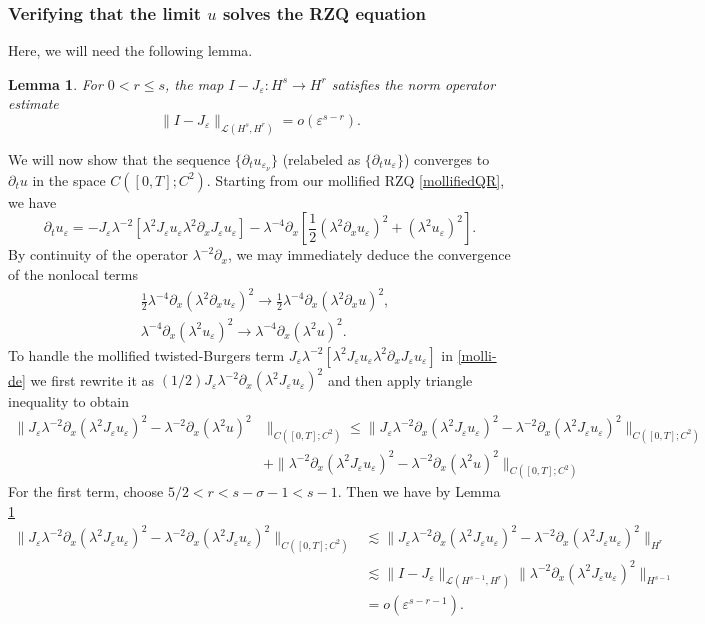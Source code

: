 \documentclass[reqno]{amsart}
\theoremstyle{plain}
\newtheorem{lemma}{Lemma}[section]
\numberwithin{equation}{section}
\newcommand{\p}{\partial}
\newcommand{\ee}{\varepsilon}
\newcommand{\s}{\sigma}
\begin{document}
\subsubsection{Verifying that the limit $u$ solves the RZQ equation}  Here, we will need the following lemma.
\begin{lemma}
\label{linop}
For $0<r\leq s$, the map $I-J_\ee:H^s \rightarrow H^r$ satisfies the norm operator estimate 
\begin{equation*}
\|I-J_\ee\|_{\mathcal{L}(H^s,H^r)}=o(\ee^{s-r}).
\end{equation*}
\end{lemma}
We will now show that the sequence $\{\p_tu_{\ee_\nu}\}$ (relabeled as $\{\p_tu_\ee\}$) converges to $\p_tu$ in the space $C([0,T];C^2)$.  Starting from our mollified RZQ \eqref{mollifiedQR}, we have
\begin{equation}\label{molli-de}
    \p_tu_\ee = -J_\ee \lambda^{-2} [ \lambda^2 J_\ee u_\ee \lambda^2 \partial_x J_\ee u_\ee ] 
  - \lambda^{-4} \p_x \left[ \frac12(\lambda^2 \p_xu_\ee)^2  +  
 (\lambda ^2  u_\ee)^2   \right].
\end{equation}
By continuity of the operator $\lambda^{-2}\p_x$, we may immediately deduce the convergence of the nonlocal terms
\begin{align*}
    &\frac12\lambda^{-4}\p_x(\lambda ^2\p_xu_\ee)^2 \to \frac12\lambda^{-4}\p_x(\lambda^2 \p_xu)^2, \\
    &\lambda^{-4}\p_x(\lambda^2 u_\ee)^2 \to \lambda^{-4}\p_x(\lambda^2 u)^2.
\end{align*}
To handle the mollified twisted-Burgers term $J_\ee \lambda^{-2} [ \lambda^2 J_\ee u_\ee \lambda^2 \partial_x J_\ee u_\ee ]$ in \eqref{molli-de} we first rewrite it as $(1/2)J_\ee\lambda^{-2}\p_x(\lambda^2 J_\ee u_\ee)^2$ and then apply triangle inequality to obtain
\begin{align}\label{ineq1}
\|J_\ee\lambda^{-2}\p_x(\lambda^2 J_\ee u_\ee)^2-\lambda^{-2}\p_x(\lambda^2 u)^2 & \|_{C([0,T];C^2)}  \leq \|J_\ee\lambda^{-2}\p_x(\lambda ^2J_\ee u_\ee)^2-\lambda^{-2}\p_x(\lambda^2  J_\ee u_\ee)^2\|_{C([0,T];C^2)} \nonumber \\
&+\|\lambda^{-2}\p_x(\lambda^2 J_\ee u_\ee)^2-\lambda^{-2}\p_x(\lambda ^2u)^2\|_{C([0,T];C^2)}
\end{align}
For the first term, choose $5/2<r<s-\s-1<s-1$.  Then we have by Lemma \ref{linop}
\begin{align}\label{ineq2}
\|J_\ee\lambda^{-2}\p_x(\lambda^2J_\ee u_\ee)^2-\lambda^{-2}\p_x(\lambda^2  J_\ee u_\ee)^2\|_{C([0,T];C^2)} &\lesssim \|J_\ee\lambda^{-2}\p_x(\lambda ^2J_\ee u_\ee)^2-\lambda^{-2}\p_x(\lambda^2  J_\ee u_\ee)^2\|_{H^r} \nonumber \\ 
& \lesssim \|I-J_\ee\|_{\mathcal{L}(H^{s-1},H^r)}\|\lambda^{-2}\p_x(\lambda ^2J_\ee u_\ee)^2\|_{H^{s-1}} \nonumber \\ 
& = o\left(\ee^{s-r-1}\right).
\end{align}
\end{document}
